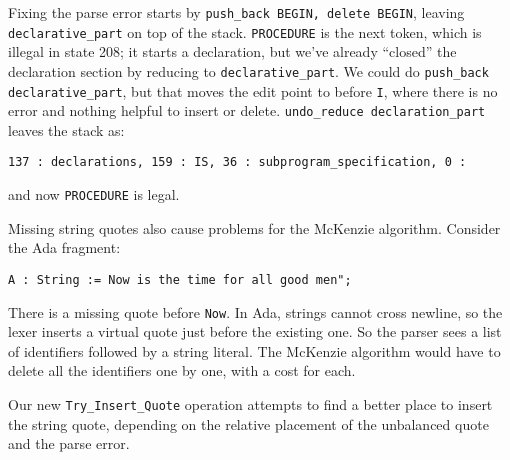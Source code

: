 \documentclass{article}
\begin{document}
Fixing the parse error starts by \verb|push_back BEGIN, delete BEGIN|,
leaving \verb|declarative_part| on top of the stack. \verb|PROCEDURE|
is the next token, which is illegal in state 208; it starts a
declaration, but we've already ``closed'' the declaration section by
reducing to \verb|declarative_part|. We could do
\verb|push_back declarative_part|, but that moves the edit point to
before \verb|I|, where there is no error and nothing helpful to insert
or delete. \verb|undo_reduce declaration_part| leaves the stack as:

\begin{verbatim}
137 : declarations, 159 : IS, 36 : subprogram_specification, 0 :
\end{verbatim}
and now \verb|PROCEDURE| is legal.

Missing string quotes also cause problems for the McKenzie algorithm.
Consider the Ada fragment:
\begin{verbatim}
A : String := Now is the time for all good men";
\end{verbatim}
There is a missing quote before \verb|Now|. In Ada, strings cannot
cross newline, so the lexer inserts a virtual quote just before the
existing one. So the parser sees a list of identifiers followed by a
string literal. The McKenzie algorithm would have to delete all the
identifiers one by one, with a cost for each.

Our new \verb|Try_Insert_Quote| operation attempts to find a better
place to insert the string quote, depending on the relative placement
of the unbalanced quote and the parse error.
\end{document}
